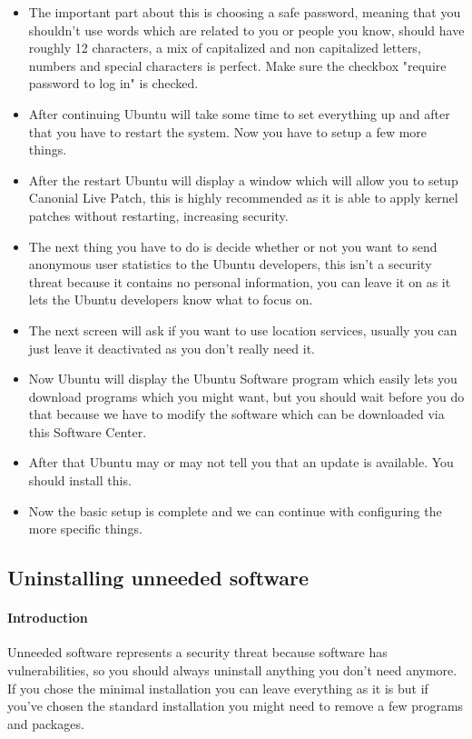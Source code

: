 \documentclass[a4paper,10pt]{article}
\begin{document}
\begin{itemize}[leftmargin=*]
\item The important part about this is choosing a safe password, meaning that you shouldn't use words which are related to you or people you know, should have roughly 12 characters, a mix of capitalized and non capitalized letters, numbers and special characters is perfect. Make sure the checkbox "require password to log in" is checked.
\item After continuing Ubuntu will take some time to set everything up and after that you have to restart the system. Now you have to setup a few more things.
\item After the restart Ubuntu will display a window which will allow you to setup Canonial Live Patch, this is highly recommended as it is able to apply kernel patches without restarting, increasing security.\cite{ubuntucanoniallivepatch} 
\item The next thing you have to do is decide whether or not you want to send anonymous user statistics to the Ubuntu developers, this isn't a security threat because it contains no personal information, you can leave it on as it lets the Ubuntu developers know what to focus on.
\item The next screen will ask if you want to use location services, usually you can just leave it deactivated as you don't really need it.
\item Now Ubuntu will display the Ubuntu Software program which easily lets you download programs which you might want, but you should wait before you do that because we have to modify the software which can be downloaded via this Software Center.
\item After that Ubuntu may or may not tell you that an update is available. You should install this.
\item Now the basic setup is complete and we can continue with configuring the more specific things.
\end{itemize}



\subsection{Uninstalling unneeded software}

\paragraph{Introduction}
Unneeded software represents a security threat because software has vulnerabilities, so you should always uninstall anything you don't need anymore. If you chose the minimal installation you can leave everything as it is but if you've chosen the standard installation you might need to remove a few programs and packages.
\end{document}
